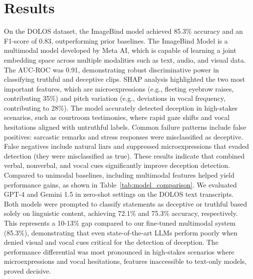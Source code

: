\documentclass[11pt]{article}
\begin{document}
\section{Results}
On the DOLOS dataset, the ImageBind \citep{girdhar2023imagebindembeddingspacebind} model achieved 85.3\% accuracy and an F1-score of 0.83, outperforming prior baselines. The ImageBind Model is a multimodal model developed by Meta AI, which is capable of learning a joint embedding space across multiple modalities such as text, audio, and visual data. The AUC-ROC was 0.91, demonstrating robust discriminative power in classifying truthful and deceptive clips. SHAP analysis highlighted the two most important features, which are microexpressions (e.g., fleeting eyebrow raises, contributing 35\%) and pitch variation (e.g., deviations in vocal frequency, contributing to 28\%). The model accurately detected deception in high-stakes scenarios, such as courtroom testimonies, where rapid gaze shifts and vocal hesitations aligned with untruthful labels. Common failure patterns include false positives: sarcastic remarks and stress responses were misclassified as deceptive. False negatives include natural liars and suppressed microexpressions that evaded detection (they were misclassified as true). These results indicate that combined verbal, nonverbal, and vocal cues significantly improve deception detection. Compared to unimodal baselines, including multimodal features helped yield performance gains, as shown in Table~\ref{tab:model_comparison}. We evaluated GPT-4 and Gemini 1.5 in zero-shot settings on the DOLOS text transcripts. Both models were prompted to classify statements as deceptive or truthful based solely on linguistic content, achieving 72.1\% and 75.3\% accuracy, respectively. This represents a 10-13\% gap compared to our fine-tuned multimodal system (85.3\%), demonstrating that even state-of-the-art LLMs perform poorly when denied visual and vocal cues critical for the detection of deception. The performance differential was most pronounced in high-stakes scenarios where microexpressions and vocal hesitations, features inaccessible to text-only models, proved decisive.
\end{document}
